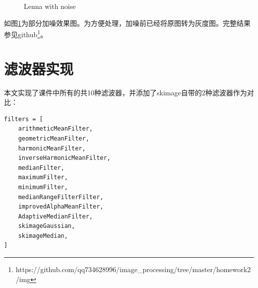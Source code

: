 \documentclass{article}
\begin{document}
\begin{figure}[ht]
	\centering
	\quad
	\caption{Lenna with noise}
	\label{fig:noise}
\end{figure}

如图\ref{fig:noise}为部分加噪效果图。为方便处理，加噪前已经将原图转为灰度图。完整结果参见github\footnote{https://github.com/qq734628996/image\_processing/tree/master/homework2/img}。

\section{滤波器实现}

本文实现了课件中所有的共10种滤波器，并添加了skimage自带的2种滤波器作为对比：

\begin{lstlisting}[title={12种滤波器对应函数名}]
filters = [
	arithmeticMeanFilter,
	geometricMeanFilter,
	harmonicMeanFilter,
	inverseHarmonicMeanFilter,
	medianFilter,
	maximumFilter,
	minimumFilter,
	medianRangeFilterFilter,
	improvedAlphaMeanFilter,
	AdaptiveMedianFilter,
	skimageGaussian,
	skimageMedian,
]
\end{lstlisting}
\end{document}
